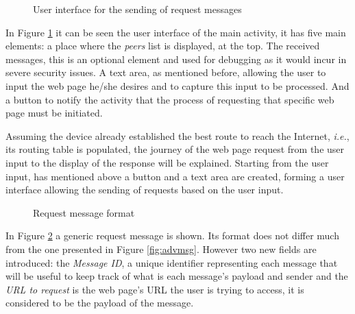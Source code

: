 \begin{figure}[ht]
   \noindent{}
	\caption{\label{fig:initScreen} User interface for the sending of request messages}
\end{figure}

In Figure \ref{fig:initScreen} it can be seen the user interface of the main activity, it has five main elements: a place where the \textit{peers} list is displayed, at the top. The received messages, this is an optional element and used for debugging as it would incur in severe security issues. A text area, as mentioned before, allowing the user to input the web page he/she desires and to capture this input to be processed. And a button to notify the activity that the process of requesting that specific web page must be initiated.

Assuming the device already established the best route to reach the Internet, \textit{i.e.}, its routing table is populated, the journey of the web page request from the user input to the display of the response will be explained. Starting from the user input, has mentioned above a button and a text area are created, forming a user interface allowing the sending of requests based on the user input.

\begin{figure}[ht]
	\noindent{}
	\caption{\label{fig:rqtmsg} Request message format}
\end{figure}

In Figure \ref{fig:rqtmsg} a generic request message is shown. Its format does not differ much from the one presented in Figure \ref{fig:advmsg}. However two new fields are introduced: the \textit{Message ID}, a unique identifier representing each message that will be useful to keep track of what is each message's payload and sender and the \textit{\gls{URL} to request} is the web page's \gls{URL} the user is trying to access, it is considered to be the payload of the message.


